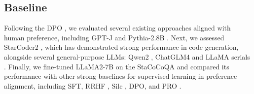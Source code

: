 \subsection{Baseline} 
Following the DPO \cite{rafailov2024direct}, we evaluated several existing approaches aligned with human preference, including GPT-J \cite{gpt-j} and Pythia-2.8B \cite{biderman2023pythia}.  
Next, we assessed StarCoder2 \cite{lozhkov2024starcoder}, which has demonstrated strong performance in code generation, alongside several general-purpose LLMs: Qwen2 \cite{qwen2}, ChatGLM4 \cite{wang2023cogvlm, glm2024chatglm} and LLaMA serials \cite{touvron2023llama,llama3modelcard}.
Finally, we fine-tuned LLaMA2-7B on the StaCoCoQA and compared its performance with other strong baselines for supervised learning in preference alignment, including SFT, RRHF \cite{yuan2024rrhf}, Silc \cite{zhao2023slic}, DPO, and PRO \cite{song2024preference}.



